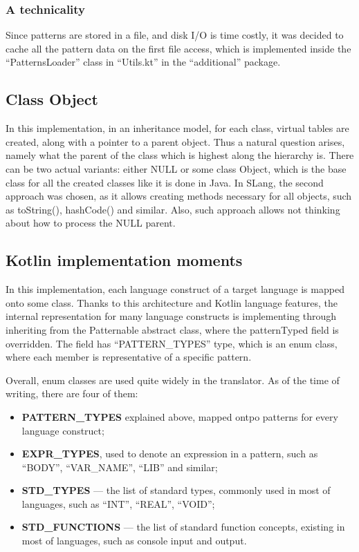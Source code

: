 \subsubsection{A technicality}
Since patterns are stored in a file, and disk I/O is time costly, it was decided to cache all the pattern data on the first file access, which is implemented inside the ``PatternsLoader'' class in ``Utils.kt'' in the ``additional'' package.

\subsection{Class Object}
In this implementation, in an inheritance model, for each class, virtual tables are created, along with a pointer to a parent object. Thus a natural question arises, namely what the parent of the class which is highest along the hierarchy is.
There can be two actual variants: either NULL or some class Object, which is the base class for all the created classes like it is done in Java. In SLang, the second approach was chosen, as it allows creating methods necessary for all objects, such as toString(), hashCode() and similar. Also, such approach allows not thinking about how to process the NULL parent.

\subsection{Kotlin implementation moments}
In this implementation, each language construct of a target language is mapped onto some class. 
Thanks to this architecture and Kotlin language features, the internal representation for many language constructs is implementing through inheriting from the Patternable abstract class, where the patternTyped field is overridden. The field has ``PATTERN\_TYPES'' type, which is an enum class, where each member is representative of a specific pattern.

Overall, enum classes are used quite widely in the translator. As of the time of writing, there are four of them:
\begin{itemize}
    \item \textbf{PATTERN\_TYPES} explained above, mapped ontpo patterns for every language construct;
    \item \textbf{EXPR\_TYPES}, used to denote an expression in a pattern, such as ``BODY'', ``VAR\_NAME'', ``LIB'' and similar;
    \item \textbf{STD\_TYPES} --- the list of standard types, commonly used in most of languages, such as ``INT'', ``REAL'', ``VOID'';
    \item \textbf{STD\_FUNCTIONS} --- the list of standard function concepts, existing in most of languages, such as console input and output.
\end{itemize}

